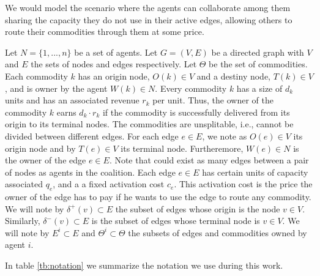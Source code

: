 \documentclass[authoryear]{elsarticle}
\begin{document}
We would model the scenario where the agents can collaborate among them sharing the capacity they do not use in their active edges, allowing others to route their commodities through them at some price. 


Let $N=\{1,...,n\}$ be a set of agents. Let $G=(V,E)$ be a directed graph with
$V$ and $E$ the sets of nodes and edges respectively. 
Let $\Theta$ be the set of commodities. Each commodity $k$ has an origin node, $O(k)\in V$ and a destiny node, $T(k)\in V$, and is owner by the agent $W(k)\in N$. Every commodity $k$ has a size of $d_k$ units and has an associated revenue $r_k$ per unit. Thus, the owner of the commodity $k$ earns $d_k\cdot r_k$ if the commodity is successfully delivered from its origin to its terminal nodes. The commodities are unsplitable, i.e., cannot be divided between different edges. For each edge $e \in E$, we note as $O(e)\in V$ its origin node and by $T(e)\in V$ its terminal node. Furtheremore, $W(e)\in N$ is the owner of the edge $e\in E$. Note that could exist as many edges between a pair of nodes as agents in the coalition. Each edge $e \in E$ has certain units of capacity associated $q_e$, and a a fixed activation
cost $c_e$. This activation cost is the price the owner of the edge has to pay if he wants to use the edge to route any commodity. We will note by $\delta^+(v)\subset E$ the subset of edges whose origin is the node $v\in V$. Similarly, $\delta^-(v)\subset E$ is the subset of edges whose terminal node is $v\in V$. We will note by $E^i \subset E$ and $\Theta^i\subset \Theta$ the subsets of edges and commodities owned by agent $i$.

In table \ref{tb:notation} we summarize the notation we use during this work.
\end{document}
